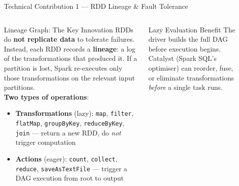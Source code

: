 \documentclass[aspectratio=169,10pt]{beamer}
\begin{document}
\begin{frame}{Technical Contribution 1 — RDD Lineage \& Fault Tolerance}
  \begin{columns}[T]
      \begin{block}{Lineage Graph: The Key Innovation}
        RDDs do \textbf{not replicate data} to tolerate failures.
        Instead, each RDD records a \textbf{lineage}:
        a log of the transformations that produced it.
        If a partition is lost, Spark re-executes only those
        transformations on the relevant input partitions.\\[5pt]
        \textbf{Two types of operations}:
        \begin{itemize}
          \item \textbf{Transformations} (lazy): \texttt{map},
                \texttt{filter}, \texttt{flatMap}, \texttt{groupByKey},
                \texttt{reduceByKey}, \texttt{join} — return a new RDD,
                do \emph{not} trigger computation
          \item \textbf{Actions} (eager): \texttt{count}, \texttt{collect},
                \texttt{reduce}, \texttt{saveAsTextFile} — trigger
                a DAG execution from root to output
        \end{itemize}
      \end{block}
      \vspace{4pt}
      \begin{exampleblock}{Lazy Evaluation Benefit}
        The driver builds the full DAG before execution begins.
        Catalyst (Spark SQL's optimiser) can reorder, fuse, or
        eliminate transformations \emph{before} a single task runs.
      \end{exampleblock}

      \begin{center}
\end{center}
\end{columns}
\end{frame}
\end{document}
